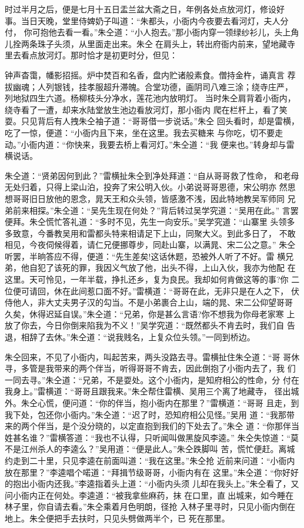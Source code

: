 时过半月之后，便是七月十五日盂兰盆大斋之日，年例各处点放河灯，修设好
事。当日天晚，堂里侍婢奶子叫道：“朱都头，小衙内今夜要去看河灯，夫人分付，
你可抱他去看一看。”朱仝道：“小人抱去。”那小衙内穿一领绿纱衫儿，头上角
儿拴两条珠子头须，从里面走出来。朱仝在肩头上，转出府衙内前来，望地藏寺
里去看点放河灯。那时恰才是初更时分，但见：

钟声杳霭，幡影招摇。炉中焚百和名香，盘内贮诸般素食。僧持金杵，诵真言
荐拔幽魂；人列银钱，挂孝服超升滞魄。合堂功德，画阴司八难三涂；绕寺庄严，
列地狱四生六道。杨柳枝头分净水，莲花池内放明灯。
当时朱仝肩背着小衙内，绕寺看了一遭，却来水陆堂放生池边看放河灯，那小衙内
爬在栏杆上，看了笑耍。只见背后有人拽朱仝袖子道：“哥哥借一步说话。”朱仝
回头看时，却是雷横，吃了一惊，便道：“小衙内且下来，坐在这里。我去买糖来
与你吃，切不要走动。”小衙内道：“你快来，我要去桥上看河灯。”朱仝道：“我
便来也。”转身却与雷横说话。

朱仝道：“贤弟因何到此？”雷横扯朱仝到净处拜道：“自从哥哥救了性命，
和老母无处归着，只得上梁山泊，投奔了宋公明入伙。小弟说哥哥恩德，宋公明亦
然思想哥哥旧日放他的恩念，晁天王和众头领，皆感激不浅，因此特地教吴军师同
兄弟前来相探。”朱仝道：“吴先生现在何处？”背后转过吴学究道：“吴用在此。”
言罢便拜。朱仝慌忙答礼道：“多时不见，先生一向安乐。”吴学究道：“山寨里
头领多多致意，今番教吴用和雷都头特来相请足下上山，同聚大义。到此多日了，
不敢相见，今夜伺候得着，请仁兄便挪尊步，同赴山寨，以满晁、宋二公之意。”
朱仝听罢，半晌答应不得，便道：“先生差矣!这话休题，恐被外人听了不好。雷
横兄弟，他自犯了该死的罪，我因义气放了他，出头不得，上山入伙，我亦为他配
在这里。天可怜见，一年半载，挣扎还乡，复为良民。我却如何肯做这等的事?你
二位便可请回，休在此间惹口面不好。”雷横道：“哥哥在此，无非只是在人之下，
伏侍他人，非大丈夫男子汉的勾当。不是小弟裹合上山，端的晁、宋二公仰望哥哥
久矣，休得迟延自误。”朱仝道：“兄弟，你是甚么言语?你不想我为你母老家寒
上放了你去，今日你倒来陷我为不义！”吴学究道：“既然都头不肯去时，我们自
告退，相辞了去休。”朱仝道：“说我贱名，上复众位头领。”一同到桥边。

朱仝回来，不见了小衙内，叫起苦来，两头没路去寻。雷横扯住朱仝道：“哥
哥休寻，多管是我带来的两个伴当，听得哥哥不肯去，因此倒抱了小衙内去了，我
们一同去寻。”朱仝道：“兄弟，不是耍处。这个小衙内，是知府相公的性命，分
付在我身上。”雷横道：“哥哥且跟我来。”朱仝帮住雷横、吴用三个离了地藏寺，
径出城外。朱仝心慌，便问道：“你的伴当，抱小衙内在那里？”雷横道：“哥哥
且走，到我下处，包还你小衙内。”朱仝道：“迟了时，恐知府相公见怪。”吴用
道：“我那带来的两个伴当，是个没分晓的，以定直抱到我们的下处去了。”朱仝
道：“你那伴当姓甚名谁？”雷横答道：“我也不认得，只听闻叫做黑旋风李逵。”
朱仝失惊道：“莫不是江州杀人的李逵么？”吴用道：“便是此人。”朱仝跌脚叫
苦，慌忙便赶。离城约走到二十里，只见李逵在前面叫道：“我在这里。”朱仝抢
近前来问道：“小衙内放在那里？”李逵唱个喏道：“拜揖节级哥哥，小衙内有在
这里。”朱仝道：“你好好的抱出小衙内还我。”李逵指着头上道：“小衙内头须
儿却在我头上。”朱仝看了，又问小衙内正在何处。李逵道：“被我拿些麻药，抹
在口里，直出城来，如今睡在林子里，你自请去看。”朱仝乘着月色明朗，径抢
入林子里寻时，只见小衙内倒在地上。朱仝便把手去扶时，只见头劈做两半个，已
死在那里。

